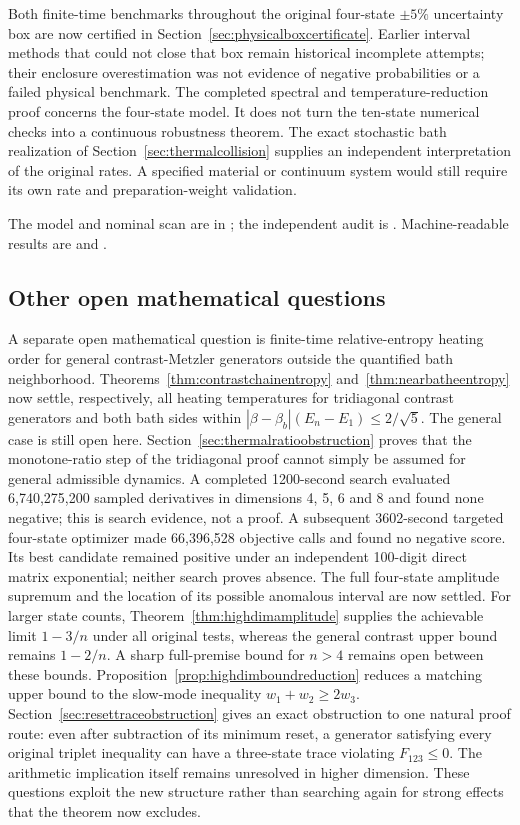 \documentclass[11pt]{article}
\begin{document}
Both finite-time benchmarks throughout the original four-state $\pm5\%$
uncertainty box are now certified in Section~\ref{sec:physicalboxcertificate}.
Earlier interval methods that could not close that box remain historical
incomplete attempts; their enclosure overestimation was not evidence of
negative probabilities or a failed physical benchmark. The completed
spectral and temperature-reduction proof concerns the four-state model.
It does not turn the ten-state numerical checks into a continuous
robustness theorem. The exact stochastic bath realization of
Section~\ref{sec:thermalcollision} supplies an independent interpretation
of the original rates. A specified material or continuum system would
still require its own rate and preparation-weight validation.

The model and nominal scan are in
; the independent audit is
. Machine-readable results
are  and
.

\subsection{Other open mathematical questions}
A separate open mathematical question is finite-time relative-entropy heating order for general contrast-Metzler generators outside the quantified bath neighborhood. Theorems~\ref{thm:contrastchainentropy} and~\ref{thm:nearbatheentropy} now settle, respectively, all heating temperatures for tridiagonal contrast generators and both bath sides within $|\beta-\beta_b|(E_n-E_1)\leq2/\sqrt5$. The general case is still open here. Section~\ref{sec:thermalratioobstruction} proves that the monotone-ratio step of the tridiagonal proof cannot simply be assumed for general admissible dynamics. A completed 1200-second search evaluated 6,740,275,200 sampled derivatives in dimensions 4, 5, 6 and 8 and found none negative; this is search evidence, not a proof. A subsequent 3602-second targeted four-state optimizer made 66,396,528 objective calls and found no negative score. Its best candidate remained positive under an independent 100-digit direct matrix exponential; neither search proves absence. The full four-state amplitude supremum and the location of its possible anomalous interval are now settled. For larger state counts, Theorem~\ref{thm:highdimamplitude} supplies the achievable limit $1-3/n$ under all original tests, whereas the general contrast upper bound remains $1-2/n$. A sharp full-premise bound for $n>4$ remains open between these bounds. Proposition~\ref{prop:highdimboundreduction} reduces a matching upper bound to the slow-mode inequality $w_1+w_2\geq2w_3$. Section~\ref{sec:resettraceobstruction} gives an exact obstruction to one natural proof route: even after subtraction of its minimum reset, a generator satisfying every original triplet inequality can have a three-state trace violating $F_{123}\leq0$. The arithmetic implication itself remains unresolved in higher dimension. These questions exploit the new structure rather than searching again for strong effects that the theorem now excludes.
\end{document}
